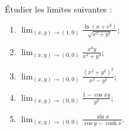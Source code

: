 \begin{exercice}[\boringexo]\label{exoLimiteContinue0006}

Étudier  les limites suivantes :
\begin{multicols}{2}
	\begin{enumerate}
\item
$\displaystyle  \lim_{(x,y)\to (1,0)} \frac{\ln (x+e^y)}{\sqrt{x^2+y^2}}$;
\item
$\displaystyle  \lim_{(x,y)\to (0,0)} \frac{x^3y}{x^4+y^4}$;
\item\minsyndical
$\displaystyle  \lim_{(x,y)\to (0,0)} \frac{(x^2+y^2)^2}{x^2-y^2} $;
\item
$\displaystyle  \lim_{(x,y)\to (0,0)} \frac{1-\cos xy}{y^2}$;
\item
$\displaystyle \lim_{(x,y)\to (0,0)} \frac{\sin x}{\cos y-\cosh x}$.
	\end{enumerate}
\end{multicols}


\end{exercice}
